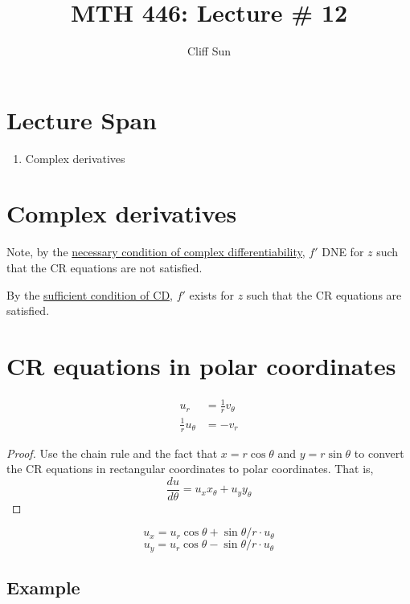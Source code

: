 \documentclass{article}
\title{MTH 446: Lecture \# 12}
\author{Cliff Sun}
\newtheorem{one minute paper}[theorem]{One Minute Paper}
\begin{document}
\maketitle

\section*{Lecture Span}
\begin{enumerate}
    \item Complex derivatives
\end{enumerate}

\section*{Complex derivatives}

Note, by the \underline{necessary condition of complex differentiability}, $f'$ DNE for $z$ such that the CR equations are not satisfied. 

By the \underline{sufficient condition of CD}, $f'$ exists for $z$ such that the CR equations are satisfied. 

\section*{CR equations in polar coordinates}

\begin{align}
    u_r &= \frac{1}{r}v_{\theta} \\
    \frac{1}{r}u_{\theta} &= -v_r
\end{align}

\begin{proof}
    Use the chain rule and the fact that $x = r\cos\theta$ and $y = r\sin\theta$ to convert the CR equations in rectangular coordinates to polar coordinates. That is, 
    \begin{equation}
        \frac{du}{d\theta} = u_x x_{\theta} + u_y y_{\theta}
    \end{equation}
\end{proof}

\begin{equation}
    u_x = u_r\cos\theta + \sin\theta/r \cdot u_{\theta}
\end{equation}
\begin{equation}
    u_y = u_r\cos\theta - \sin\theta/r \cdot u_{\theta}
\end{equation}

\subsection*{Example}
\end{document}
